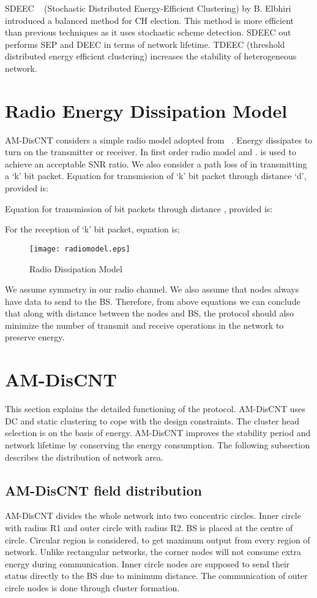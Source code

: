 \documentclass[journal]{IEEEtran}
\begin{document}
 SDEEC ~\cite{15} (Stochastic Distributed Energy-Efficient Clustering) by B. Elbhiri introduced a balanced method for CH election. This method is more efficient than previous techniques as it uses stochastic scheme detection. SDEEC out performs SEP and DEEC in terms of network lifetime.
  TDEEC (threshold distributed energy efficient clustering) increases the stability of heterogeneous network.


\section{Radio Energy Dissipation Model}
AM-DisCNT considers a simple radio model adopted from ~\cite{16}. Energy dissipates to turn on the transmitter or receiver. In first order radio model  and .  is used to achieve an acceptable SNR ratio.
We also consider a path loss of  in transmitting a ‘k’ bit packet. Equation for transmission of ‘k’ bit packet through distance ‘d’, provided  is:

 
 Equation for transmission of  bit packets through distance , provided  is:
 
  For the reception of ‘k’ bit packet, equation is;

 

\begin{figure}[ht]
\begin{center}
\texttt{[image: radiomodel.eps]}
\caption{Radio Dissipation Model}
\end{center}
\end{figure}
We assume symmetry in our radio channel. We also assume that nodes always have data to send to the BS. Therefore, from above equations we can conclude that along with distance between the nodes and BS, the protocol should also minimize the number of transmit and receive operations in the network to preserve energy.
\section{AM-DisCNT}
 This section explains the detailed functioning of the protocol. AM-DisCNT uses DC and static clustering to cope with the design constraints. The cluster head selection is on the basis of energy. AM-DisCNT improves the stability period and network lifetime by conserving the energy consumption.
 The following subsection describes the distribution of network area.
\subsection{AM-DisCNT field distribution}
 AM-DisCNT divides the whole network into two concentric circles. Inner circle with radius R1 and outer circle with radius R2. BS is placed at the centre of circle. Circular region is considered, to get maximum output from every region of network. Unlike rectangular networks, the corner nodes will not consume extra energy during communication. Inner circle nodes are supposed to send their status directly to the BS due to minimum distance. The communication of outer circle nodes is done through cluster formation.
\end{document}

